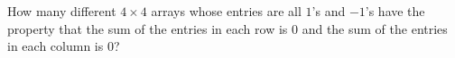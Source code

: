 How many different $4\times4$ arrays whose entries are all $1$'s and $-1$'s have the property that the sum of the entries in each row is $0$ and the sum of the entries in each column is $0$?
